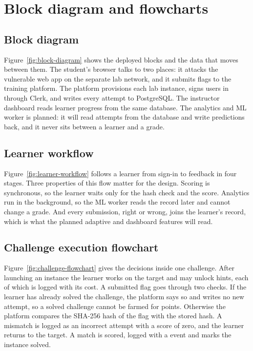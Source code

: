 \chapter{Block diagram and flowcharts}
\label{ch:flowcharts}

\section{Block diagram}

Figure~\ref{fig:block-diagram} shows the deployed blocks and the data that moves between them. The student's browser talks to two places: it attacks the vulnerable web app on the separate lab network, and it submits flags to the training platform. The platform provisions each lab instance, signs users in through Clerk, and writes every attempt to PostgreSQL. The instructor dashboard reads learner progress from the same database. The analytics and ML worker is planned: it will read attempts from the database and write predictions back, and it never sits between a learner and a grade.


\section{Learner workflow}

Figure~\ref{fig:learner-workflow} follows a learner from sign-in to feedback in four stages. Three properties of this flow matter for the design. Scoring is synchronous, so the learner waits only for the hash check and the score. Analytics run in the background, so the ML worker reads the record later and cannot change a grade. And every submission, right or wrong, joins the learner's record, which is what the planned adaptive and dashboard features will read.


\section{Challenge execution flowchart}

Figure~\ref{fig:challenge-flowchart} gives the decisions inside one challenge. After launching an instance the learner works on the target and may unlock hints, each of which is logged with its cost. A submitted flag goes through two checks. If the learner has already solved the challenge, the platform says so and writes no new attempt, so a solved challenge cannot be farmed for points. Otherwise the platform compares the SHA-256 hash of the flag with the stored hash. A mismatch is logged as an incorrect attempt with a score of zero, and the learner returns to the target. A match is scored, logged with a  event and marks the instance solved.

